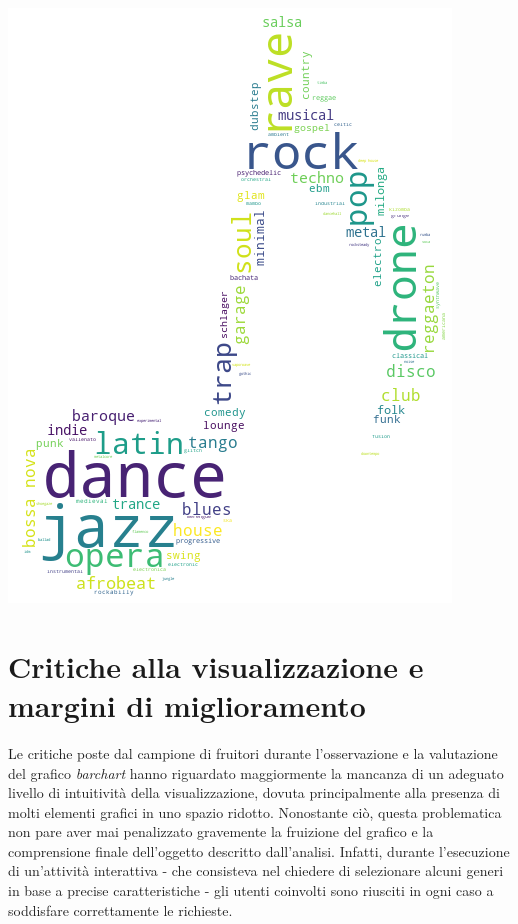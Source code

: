 \documentclass[12pt, a4paper, twocolumn]{article} %
\begin{document}
\includegraphics[width=\linewidth]{music_word_cloud.png}

\section{Critiche alla visualizzazione e margini di miglioramento}
Le critiche poste dal campione di fruitori durante l'osservazione e la valutazione del grafico \textit{barchart} hanno riguardato maggiormente la mancanza di un adeguato livello di intuitività della visualizzazione, dovuta principalmente alla presenza di molti elementi grafici in uno spazio ridotto.
Nonostante ciò, questa problematica non pare aver mai penalizzato gravemente la fruizione del grafico e la comprensione finale dell'oggetto descritto dall'analisi. 
Infatti, durante l'esecuzione di un'attività interattiva - che consisteva nel chiedere di selezionare alcuni generi in base a precise caratteristiche - gli utenti coinvolti sono riusciti in ogni caso a soddisfare correttamente le richieste.
\end{document}
